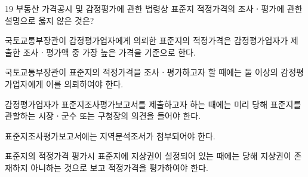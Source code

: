 \begin{question}{19}
부동산 가격공시 및 감정평가에 관한 법령상 표준지 적정가격의 조사ㆍ평가에 관한 설명으로 옳지 않은 것은?
\begin{choices}
  \item 국토교통부장관이 감정평가업자에게 의뢰한 표준지의 적정가격은 감정평가업자가 제출한 조사ㆍ평가액 중 가장 높은 가격을 기준으로 한다.
  \item 국토교통부장관이 표준지의 적정가격을 조사ㆍ평가하고자 할 때에는 둘 이상의 감정평가업자에게 이를 의뢰하여야 한다.
  \item 감정평가업자가 표준지조사평가보고서를 제출하고자 하는 때에는 미리 당해 표준지를 관할하는 시장ㆍ군수 또는 구청장의 의견을 들어야 한다.
  \item 표준지조사평가보고서에는 지역분석조서가 첨부되어야 한다.
  \item 표준지의 적정가격 평가시 표준지에 지상권이 설정되어 있는 때에는 당해 지상권이 존재하지 아니하는 것으로 보고 적정가격을 평가하여야 한다.
\end{choices}
\end{question}
